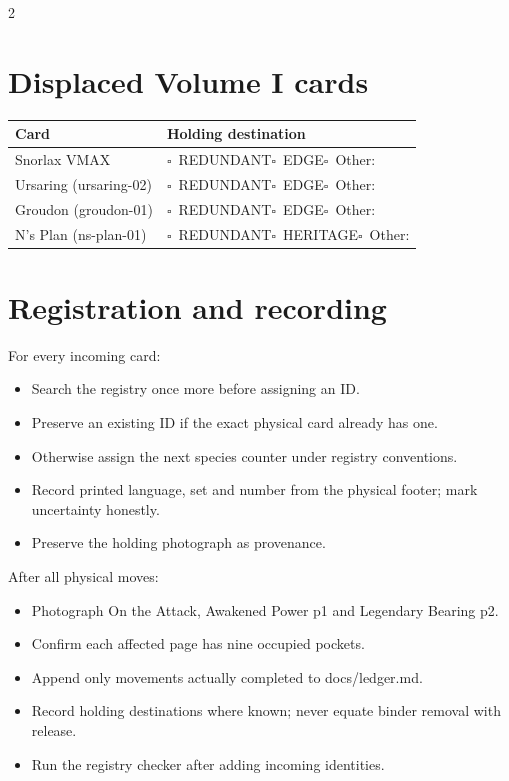 \documentclass[10pt,a4paper]{article}
\newcommand{\cb}{$\square$}
\begin{document}
\begin{multicols}{2}
\section{Displaced Volume I cards}
\begin{tabularx}{\linewidth}{@{}l X@{}}
\textbf{Card} & \textbf{Holding destination}\\ \hline
Snorlax VMAX & \cb\ REDUNDANT\quad \cb\ EDGE\quad \cb\ Other: \hrulefill\\
Ursaring (ursaring-02) & \cb\ REDUNDANT\quad \cb\ EDGE\quad \cb\ Other: \hrulefill\\
Groudon (groudon-01) & \cb\ REDUNDANT\quad \cb\ EDGE\quad \cb\ Other: \hrulefill\\
N's Plan (ns-plan-01) & \cb\ REDUNDANT\quad \cb\ HERITAGE\quad \cb\ Other: \hrulefill\\
\end{tabularx}

\section{Registration and recording}
For every incoming card:
\begin{itemize}
\item Search the registry once more before assigning an ID.
\item Preserve an existing ID if the exact physical card already has one.
\item Otherwise assign the next species counter under registry conventions.
\item Record printed language, set and number from the physical footer; mark uncertainty honestly.
\item Preserve the holding photograph as provenance.
\end{itemize}

After all physical moves:
\begin{itemize}
\item Photograph On the Attack, Awakened Power p1 and Legendary Bearing p2.
\item Confirm each affected page has nine occupied pockets.
\item Append only movements actually completed to docs/ledger.md.
\item Record holding destinations where known; never equate binder removal with release.
\item Run the registry checker after adding incoming identities.
\end{itemize}


\end{multicols}
\end{document}
